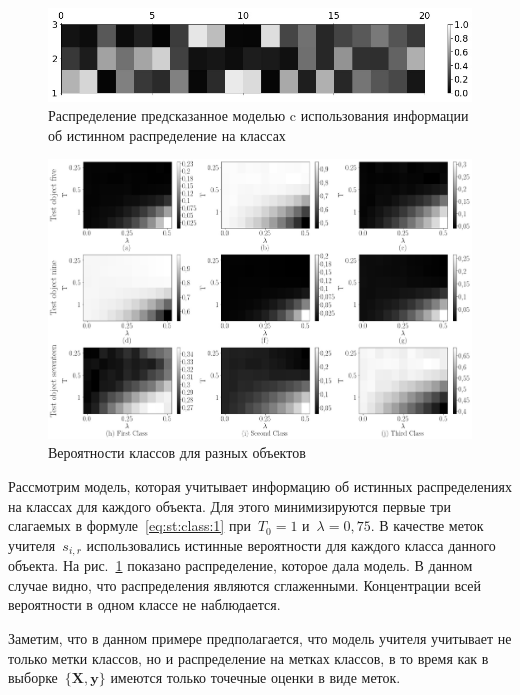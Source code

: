 \begin{figure}[h!t]\center
\includegraphics[width=1\textwidth]{results/privlearn/syn_with_teacher_distr}
\caption{Распределение предсказанное моделью c использования информации об истинном распределение на классах}
\label{fg:ex:synt:distr:with}
\end{figure}

\begin{figure}[h!t]\center
\includegraphics[width=1\textwidth]{results/privlearn/syn_T_lambda}
\caption{Вероятности классов для разных объектов}
\label{fg:ex:synt:distr:lambda_T}
\end{figure}

Рассмотрим модель, которая учитывает информацию об истинных распределениях на классах для каждого объекта. Для этого минимизируются первые три слагаемых в формуле~\eqref{eq:st:class:1} при~$T_0=1$ и~$\lambda=0{,}75$. В качестве меток учителя~$s_{i,r}$ использовались истинные вероятности для каждого класса данного объекта. На рис.~\ref{fg:ex:synt:distr:with} показано распределение, которое дала модель. В данном случае видно, что распределения являются сглаженными. Концентрации всей вероятности в одном классе не наблюдается.

Заметим, что в данном примере предполагается, что модель учителя учитывает не только метки классов, но и распределение на метках классов, в то время как в выборке~$\{\mathbf{X}, \mathbf{y}\}$ имеются только точечные оценки в виде меток. 

